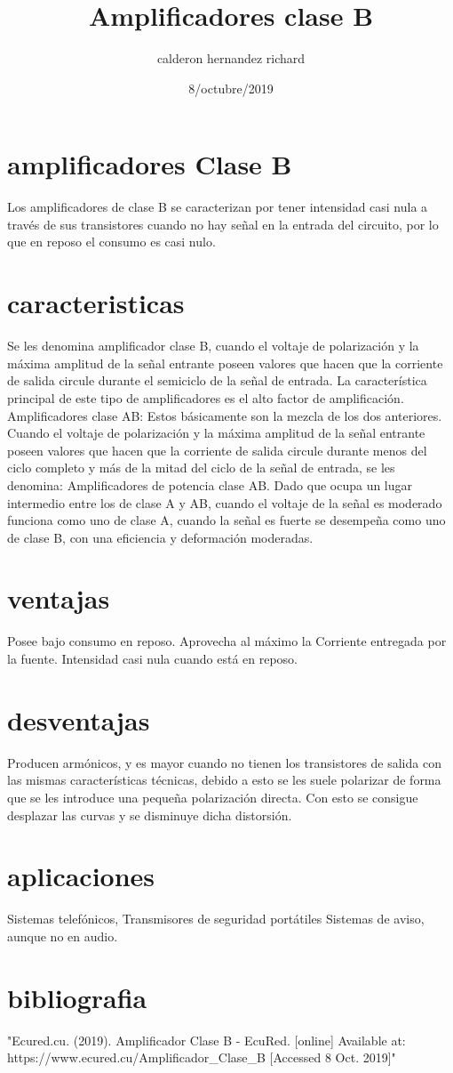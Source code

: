 \documentclass{article}
\title{Amplificadores clase B}
\author{calderon hernandez richard}
\date{8/octubre/2019}
\begin{document}
\maketitle

\section{amplificadores Clase B}
Los amplificadores de clase B se caracterizan por tener intensidad casi nula a través de sus transistores cuando no hay señal en la entrada del circuito, por lo que en reposo el consumo es casi nulo. 

\section{caracteristicas}
Se les denomina amplificador clase B, cuando el voltaje de polarización y la máxima amplitud de la señal entrante poseen valores que hacen que la corriente de salida circule durante el semiciclo de la señal de entrada. 
La característica principal de este tipo de amplificadores es el alto factor de amplificación. 
Amplificadores clase AB: Estos básicamente son la mezcla de los dos anteriores. Cuando el voltaje de polarización y la máxima amplitud de la señal entrante poseen valores que hacen que la corriente de salida circule durante menos del ciclo completo y más de la mitad del ciclo de la señal de entrada, se les denomina: Amplificadores de potencia clase AB. 
Dado que ocupa un lugar intermedio entre los de clase A y AB, cuando el voltaje de la señal es moderado funciona como uno de clase A, cuando la señal es fuerte se desempeña como uno de clase B, con una eficiencia y deformación moderadas. 

\section{ventajas}
Posee bajo consumo en reposo.
Aprovecha al máximo la Corriente entregada por la fuente.
Intensidad casi nula cuando está en reposo.
\section{desventajas}
Producen armónicos, y es mayor cuando no tienen los transistores de salida con las mismas características técnicas, debido a esto se les suele polarizar de forma que se les introduce una pequeña polarización directa. Con esto se consigue desplazar las curvas y se disminuye dicha distorsión.
\section{aplicaciones}
Sistemas telefónicos,
Transmisores de seguridad portátiles
Sistemas de aviso, aunque no en audio.

\section{bibliografia}
"Ecured.cu. (2019). Amplificador Clase B - EcuRed. [online] Available at: https://www.ecured.cu/Amplificador_Clase_B [Accessed 8 Oct. 2019]"
\end{document}

